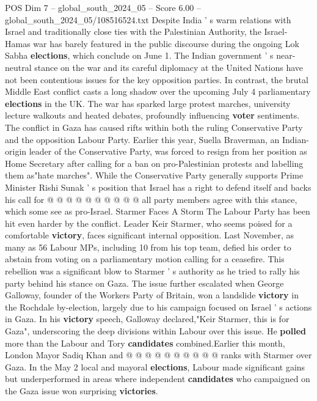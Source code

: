 \begin{textsample}{POS Dim 7 – global\_south\_2024\_05 – Score 6.00 – global\_south\_2024\_05/108516524.txt}  \label{ex:f7_pos_212}
Despite India ' s warm relations with Israel and traditionally close ties with the Palestinian Authority, the Israel-Hamas war has barely featured in the public discourse during the ongoing Lok Sabha \textbf{elections}, which conclude on June 1.
The Indian government ' s near-neutral stance on the war and its careful diplomacy at the United Nations have not been contentious issues for the key opposition parties.
In contrast, the brutal Middle East conflict casts a long shadow over the upcoming July 4 parliamentary \textbf{elections} in the UK.
The war has sparked large protest marches, university lecture walkouts and heated debates, profoundly influencing \textbf{voter} sentiments.
The conflict in Gaza has caused rifts within both the ruling Conservative Party and the opposition Labour Party.
Earlier this year, Suella Braverman, an Indian-origin leader of the Conservative Party, was forced to resign from her position as Home Secretary after calling for a ban on pro-Palestinian protests and labelling them as"hate marches".
While the Conservative Party generally supports Prime Minister Rishi Sunak ' s position that Israel has a right to defend itself and backs his call for @ @ @ @ @ @ @ @ @ @ all party members agree with this stance, which some see as pro-Israel.
Starmer Faces A Storm The Labour Party has been hit even harder by the conflict.
Leader Keir Starmer, who seems poised for a comfortable \textbf{victory}, faces significant internal opposition.
Last November, as many as 56 Labour MPs, including 10 from his top team, defied his order to abstain from voting on a parliamentary motion calling for a ceasefire.
This rebellion was a significant blow to Starmer ' s authority as he tried to rally his party behind his stance on Gaza.
The issue further escalated when George Galloway, founder of the Workers Party of Britain, won a landslide \textbf{victory} in the Rochdale by-election, largely due to his campaign focused on Israel ' s actions in Gaza.
In his \textbf{victory} speech, Galloway declared,"Keir Starmer, this is for Gaza", underscoring the deep divisions within Labour over this issue.
He \textbf{polled} more than the Labour and Tory \textbf{candidates} combined.Earlier this month, London Mayor Sadiq Khan and @ @ @ @ @ @ @ @ @ @ ranks with Starmer over Gaza.
In the May 2 local and mayoral \textbf{elections}, Labour made significant gains but underperformed in areas where independent \textbf{candidates} who campaigned on the Gaza issue won surprising \textbf{victories}.

\end{textsample}
